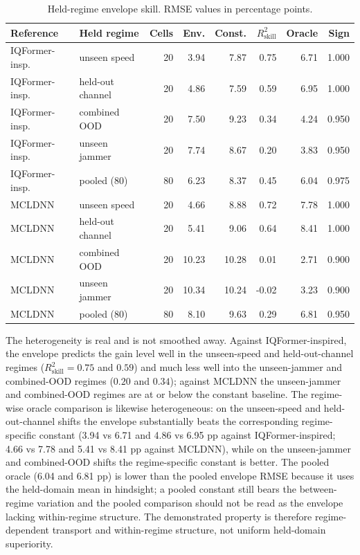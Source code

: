 \documentclass[letterpaper,onecolumn,11pt,journal]{IEEEtran}
\newcommand{\pp}{percentage points}
\begin{document}
\begin{table}[t]
\centering
\caption{Held-regime envelope skill. RMSE values in \pp.}
\label{tab:regime}
\scriptsize
\setlength{\tabcolsep}{2.4pt}
\begin{tabular}{llrrrrrr}
\toprule
Reference & Held regime & Cells & Env. & Const. & $R^2_{\mathrm{skill}}$ & Oracle & Sign\\
\midrule
IQFormer-insp. & unseen speed & 20 & 3.94 & 7.87 & 0.75 & 6.71 & 1.000\\
IQFormer-insp. & held-out channel & 20 & 4.86 & 7.59 & 0.59 & 6.95 & 1.000\\
IQFormer-insp. & combined OOD & 20 & 7.50 & 9.23 & 0.34 & 4.24 & 0.950\\
IQFormer-insp. & unseen jammer & 20 & 7.74 & 8.67 & 0.20 & 3.83 & 0.950\\
IQFormer-insp. & pooled (80) & 80 & 6.23 & 8.37 & 0.45 & 6.04 & 0.975\\
\midrule
MCLDNN & unseen speed & 20 & 4.66 & 8.88 & 0.72 & 7.78 & 1.000\\
MCLDNN & held-out channel & 20 & 5.41 & 9.06 & 0.64 & 8.41 & 1.000\\
MCLDNN & combined OOD & 20 & 10.23 & 10.28 & 0.01 & 2.71 & 0.900\\
MCLDNN & unseen jammer & 20 & 10.34 & 10.24 & -0.02 & 3.23 & 0.900\\
MCLDNN & pooled (80) & 80 & 8.10 & 9.63 & 0.29 & 6.81 & 0.950\\
\bottomrule
\end{tabular}
\end{table}

The heterogeneity is real and is not smoothed away. Against
IQFormer-inspired, the envelope predicts the gain level well in the
unseen-speed and held-out-channel regimes ($R^2_{\mathrm{skill}}=0.75$ and
$0.59$) and much less well into the unseen-jammer and combined-OOD regimes
($0.20$ and $0.34$); against MCLDNN the unseen-jammer and combined-OOD regimes
are at or below the constant baseline. The regime-wise oracle comparison is
likewise heterogeneous: on the unseen-speed and held-out-channel shifts the
envelope substantially beats the corresponding regime-specific constant
(3.94 vs 6.71 and 4.86 vs 6.95 pp against IQFormer-inspired; 4.66 vs 7.78
and 5.41 vs 8.41 pp against MCLDNN), while on the unseen-jammer and
combined-OOD shifts the regime-specific constant is better. The pooled oracle
(6.04 and 6.81 pp) is lower than the pooled envelope RMSE because it
uses the held-domain mean in hindsight; a pooled constant still bears the
between-regime variation and the pooled comparison should not be read as the
envelope lacking within-regime structure. The demonstrated property is
therefore regime-dependent transport and within-regime structure, not uniform
held-domain superiority.
\end{document}
